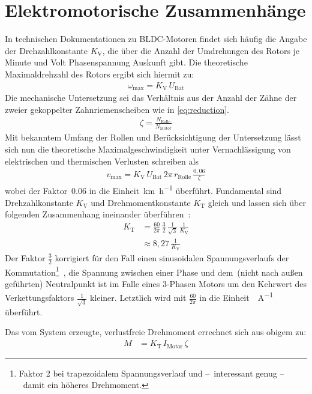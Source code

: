 	\section{Elektromotorische Zusammenhänge}
		In technischen Dokumentationen zu BLDC-Motoren findet sich häufig die Angabe der Drehzahlkonstante \(K_\text{V}\), die über die Anzahl der Umdrehungen des Rotors je Minute und Volt Phasenspannung Auskunft gibt.
		Die theoretische Maximaldrehzahl des Rotors ergibt sich hiermit zu:
		\begin{align}
			\omega_\text{max} = K_\text{V} \, U_\text{Bat}
			\label{eq:max rpm}
		\end{align}%
		Die mechanische Untersetzung sei das Verhältnis aus der Anzahl der Zähne der zweier gekoppelter Zahnriemenscheiben wie in \cref{eq:reduction}.
		\begin{align}
			\zeta = \frac{N_\text{Rolle}}{N_\text{Motor}}
			\label{eq:reduction}
		\end{align}%
		Mit bekanntem Umfang der Rollen und Berücksichtigung der Untersetzung lässt sich nun die theoretische Maximalgeschwindigkeit unter Vernachlässigung von elektrischen und thermischen Verlusten schreiben als
		\begin{align}
			v_\text{max} = K_\text{V} \, U_\text{Bat} \, 2\pi \, r_\text{Rolle} \, \frac{0,06}{\zeta}
			\label{eq:max speed km h}
		\end{align}%
		wobei der Faktor~\num{0,06} in  die Einheit~\unit{\kilo\metre\per\hour} überführt.
		Fundamental sind Drehzahlkonstante \(K_\text{V}\) und Drehmomentkonstante \(K_\text{T}\) gleich und lassen sich über folgenden Zusammenhang ineinander überführen~\cites{mevey2009sensorless}{DalY.Ohm.2000}{AN885.BLDC.fundamentals}:
		\begin{align}
			K_\text{T}	&= \frac{60}{2\pi} \, \frac{3}{2} \, \frac{1}{\sqrt{3}} \, \frac{1}{K_\text{V}} \nonumber \\
				&\approx 8,27 \, \frac{1}{K_\text{V}}
			\label{eq:kv to kt}
		\end{align}%
		Der Faktor \(\frac{3}{2}\) korrigiert für den Fall einen sinusoidalen Spannungsverlaufs der Kommutation\footnote{\hspace{1mm}Faktor 2 bei trapezoidalem Spannungsverlauf und --~interessant genug --~damit ein höheres Drehmoment.}~\cites{mevey2009sensorless}{DalY.Ohm.2000}, die Spannung zwischen einer Phase und dem~(nicht nach außen geführten) Neutralpunkt ist im Falle eines 3-Phasen Motors um den Kehrwert des Verkettungsfaktors \(\frac{1}{\sqrt{3}}\) kleiner.
		Letztlich wird mit \(\frac{60}{2\pi}\) in die Einheit~\unit{\newtonmetre\per\ampere} überführt.\par\medskip
		Das vom System erzeugte, verlustfreie Drehmoment errechnet sich aus obigem zu:
		\begin{align}
			M	&= K_\text{T} \, I_\text{Motor} \, \zeta
			\label{eq:frictionless torque}
		\end{align}